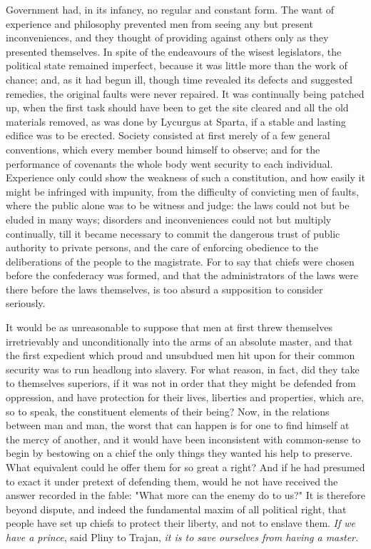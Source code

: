 \documentclass[12pt]{report}
\begin{document}
Government had, in its infancy, no regular and constant form. The want of experience and philosophy prevented men from seeing any but present inconveniences, and they thought of providing against others only as they presented themselves. In spite of the endeavours of the wisest legislators, the political state remained imperfect, because it was little more than the work of chance; and, as it had begun ill, though time revealed its defects and suggested remedies, the original faults were never repaired. It was continually being patched up, when the first task should have been to get the site cleared and all the old materials removed, as was done by Lycurgus at Sparta, if a stable and lasting edifice was to be erected. Society consisted at first merely of a few general conventions, which every member bound himself to observe; and for the performance of covenants the whole body went security to each individual. Experience only could show the weakness of such a constitution, and how easily it might be infringed with impunity, from the difficulty of convicting men of faults, where the public alone was to be witness and judge: the laws could not but be eluded in many ways; disorders and inconveniences could not but multiply continually, till it became necessary to commit the dangerous trust of public authority to private persons, and the care of enforcing obedience to the deliberations of the people to the magistrate. For to say that chiefs were chosen before the confederacy was formed, and that the administrators of the laws were there before the laws themselves, is too absurd a supposition to consider seriously.

It would be as unreasonable to suppose that men at first threw themselves irretrievably and unconditionally into the arms of an absolute master, and that the first expedient which proud and unsubdued men hit upon for their common security was to run headlong into slavery. For what reason, in fact, did they take to themselves superiors, if it was not in order that they might be defended from oppression, and have protection for their lives, liberties and properties, which are, so to speak, the constituent elements of their being? Now, in the relations between man and man, the worst that can happen is for one to find himself at the mercy of another, and it would have been inconsistent with common-sense to begin by bestowing on a chief the only things they wanted his help to preserve. What equivalent could he offer them for so great a right? And if he had presumed to exact it under pretext of defending them, would he not have received the answer recorded in the fable: "What more can the enemy do to us?" It is therefore beyond dispute, and indeed the fundamental maxim of all political right, that people have set up chiefs to protect their liberty, and not to enslave them. \textit{If we have a prince}, said Pliny to Trajan, \textit{it is to save ourselves from having a master.}
\end{document}
